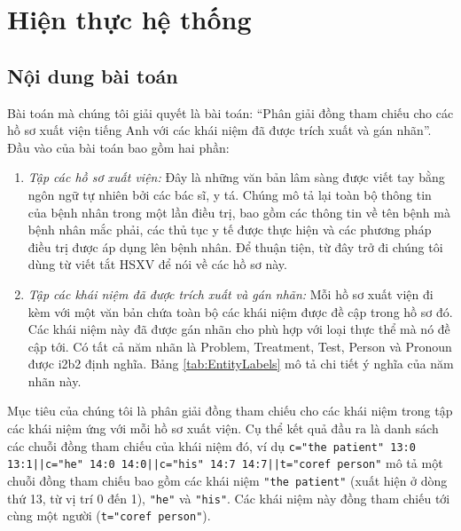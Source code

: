 \chapter{Hiện thực hệ thống} \label{hienthuchethong}
\section{Nội dung bài toán}
Bài toán mà chúng tôi giải quyết là bài toán: ``Phân giải đồng tham chiếu cho các hồ sơ xuất viện tiếng Anh với các khái niệm đã được trích xuất và gán nhãn''. Đầu vào của bài toán bao gồm hai phần:

\begin{enumerate}[leftmargin=\the\parindent]
\item \emph{Tập các hồ sơ xuất viện: }Đây là những văn bản lâm sàng được viết tay bằng ngôn ngữ tự nhiên bởi các bác sĩ, y tá. Chúng mô tả lại toàn bộ thông tin của bệnh nhân trong một lần điều trị, bao gồm các thông tin về tên bệnh mà bệnh nhân mắc phải, các thủ tục y tế được thực hiện và các phương pháp điều trị được áp dụng lên bệnh nhân. Để thuận tiện, từ đây trở đi chúng tôi dùng từ viết tắt HSXV để nói về các hồ sơ này.
\item \emph{Tập các khái niệm đã được trích xuất và gán nhãn:} Mỗi hồ sơ xuất viện đi kèm với một văn bản chứa toàn bộ các khái niệm được đề cập trong hồ sơ đó. Các khái niệm này đã được gán nhãn cho phù hợp với loại thực thể mà nó đề cập tới. Có tất cả năm nhãn là Problem, Treatment, Test, Person và Pronoun được i2b2 định nghĩa. Bảng \ref{tab:EntityLabels} mô tả chi tiết ý nghĩa của năm nhãn này.
\end{enumerate}

Mục tiêu của chúng tôi là phân giải đồng tham chiếu cho các khái niệm trong tập các khái niệm ứng với mỗi hồ sơ xuất viện. Cụ thể kết quả đầu ra là danh sách các chuỗi đồng tham chiếu của khái niệm đó, ví dụ \texttt{c="the patient" 13:0 13:1||c="he" 14:0 14:0||c="his" 14:7 14:7||t="coref person"} mô tả một chuỗi đồng tham chiếu bao gồm các khái niệm \texttt{"the patient"} (xuất hiện ở dòng thứ 13, từ vị trí 0 đến 1), \texttt{"he"} và \texttt{"his"}. Các khái niệm này đồng tham chiếu tới cùng một người (\texttt{t="coref person"}).

